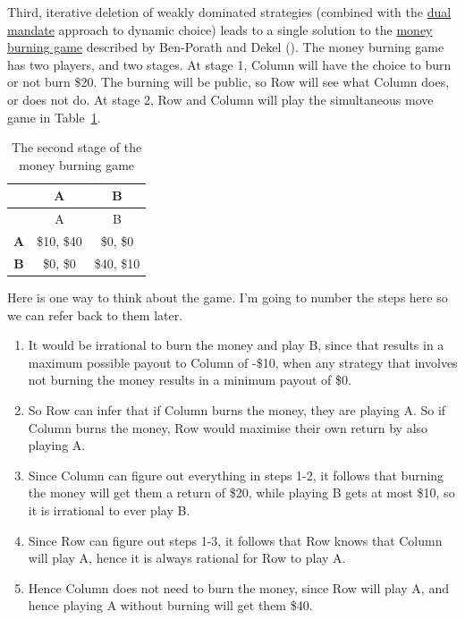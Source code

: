 \documentclass[
  12pt,
  letterpaper,
  DIV=11,
  numbers=noendperiod]{scrreprt}
\providecommand{\tightlist}{%
  \setlength{\itemsep}{0pt}\setlength{\parskip}{0pt}}\usepackage{longtable,booktabs,array}
\begin{document}
Third, iterative deletion of weakly dominated strategies (combined with
the \href{dual.qmd}{dual mandate} approach to dynamic choice) leads to a
single solution to the \hyperref[tbl-money-burning]{money burning game}
described by Ben-Porath and Dekel
(). The money burning game has
two players, and two stages. At stage 1, Column will have the choice to
burn or not burn \$20. The burning will be public, so Row will see what
Column does, or does not do. At stage 2, Row and Column will play the
simultaneous move game in Table~\ref{tbl-money-burning-part-two}.

\begin{longtable}[]{@{}ccc@{}}
\caption{The second stage of the money burning
game}\label{tbl-money-burning-part-two}\tabularnewline
\toprule\noalign{}
& A & B \\
\midrule\noalign{}
\endfirsthead
\toprule\noalign{}
& A & B \\
\midrule\noalign{}
\endhead
\bottomrule\noalign{}
\endlastfoot
\textbf{A} & \$10, \$40 & \$0, \$0 \\
\textbf{B} & \$0, \$0 & \$40, \$10 \\
\end{longtable}

Here is one way to think about the game. I'm going to number the steps
here so we can refer back to them later.

\begin{enumerate}
\def\labelenumi{\arabic{enumi}.}
\tightlist
\item
  It would be irrational to burn the money and play B, since that
  results in a maximum possible payout to Column of -\$10, when any
  strategy that involves not burning the money results in a minimum
  payout of \$0.
\item
  So Row can infer that if Column burns the money, they are playing A.
  So if Column burns the money, Row would maximise their own return by
  also playing A.
\item
  Since Column can figure out everything in steps 1-2, it follows that
  burning the money will get them a return of \$20, while playing B gets
  at most \$10, so it is irrational to ever play B.
\item
  Since Row can figure out steps 1-3, it follows that Row knows that
  Column will play A, hence it is always rational for Row to play A.
\item
  Hence Column does not need to burn the money, since Row will play A,
  and hence playing A without burning will get them \$40.
\end{enumerate}
\end{document}
